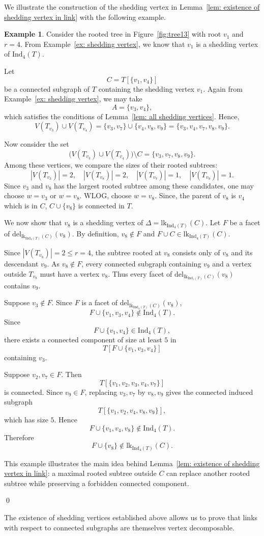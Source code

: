 \documentclass[12pt,reqno]{amsart}
\theoremstyle{definition}
\newtheorem{example}[theorem]{Example}
\def\Ind{\mathrm{Ind}}
\def\del{\mathrm{del}}
\def\lk{\mathrm{lk}}
\begin{document}
We illustrate the construction of the shedding vertex in Lemma~\ref{lem: existence of shedding vertex in link} with the following example.

\begin{example}
Consider the rooted tree in Figure~\ref{fig:tree13} with root $v_1$ and $r=4$. From Example~\ref{ex: shedding vertex}, we know that $v_1$ is a shedding vertex of $\Ind_4(T)$. 

Let 
\[
C = T[\{v_1,v_4\}]
\]
be a connected subgraph of $T$ containing the shedding vertex $v_1$. Again from Example~\ref{ex: shedding vertex}, we may take
\[
A=\{v_3,v_4\},
\]
which satisfies the conditions of Lemma~\ref{lem: all shedding vertices}. Hence,
\[
V(T_{v_3}) \cup V(T_{v_4}) = \{v_3,v_7\} \cup \{v_4,v_8,v_9\}
= \{v_3,v_4,v_7,v_8,v_9\}.
\]

Now consider the set
\[
\big(V(T_{v_3}) \cup V(T_{v_4})\big)\setminus C
= \{v_3,v_7,v_8,v_9\}.
\]
Among these vertices, we compare the sizes of their rooted subtrees:
\[
|V(T_{v_3})|=2,\quad |V(T_{v_8})|=2,\quad |V(T_{v_7})|=1,\quad |V(T_{v_9})|=1.
\]
Since $v_3$ and $v_8$ has the largest rooted subtree among these candidates, one may choose $w=v_3$ or $w=v_8$. WLOG, choose $w = v_8$. Since, the parent of $v_8$ is $v_4$ which is in $C$, $C\cup\{v_8\}$ is connected in $T$.

We now show that $v_8$ is a shedding vertex of $\Delta=\lk_{\Ind_4(T)}(C)$. Let $F$ be a facet of $\del_{\lk_{\Ind_4(T)}(C)}(v_8)$. By definition, $v_8 \notin F$ and $F \cup C \in \lk_{\Ind_4(T)}(C)$.

Since $|V(T_{v_8})|=2 \le r=4$, the subtree rooted at $v_8$ consists only of $v_8$ and its descendant $v_9$. As $v_8 \notin F$, every connected subgraph containing $v_9$ and a vertex outside $T_{v_8}$ must have a vertex $v_8$. Thus every facet of $\del_{\lk_{\Ind_r(T)}(C)}(v_8)$ contains $v_9$. 

Suppose $v_3 \notin F$. Since $F$ is a facet of $\del_{\lk_{\Ind_4(T)}(C)}(v_8)$,
\[
F \cup \{v_1,v_3,v_4\} \notin \Ind_4(T).
\]
Since
\[
F \cup \{v_1,v_4\} \in \Ind_4(T),
\]
there exists a connected component of size at least $5$ in
\[
T[F \cup \{v_1,v_3,v_4\}]
\]
containing $v_3$.

Suppose $v_2,v_7 \in F$. Then
\[
T[\{v_1,v_2,v_3,v_4,v_7\}]
\]
is connected. Since $v_9 \in F$, replacing $v_3,v_7$ by $v_8,v_9$ gives the connected induced subgraph
\[
T[\{v_1,v_2,v_4,v_8,v_9\}],
\]
which has size $5$. Hence
\[
F \cup \{v_1,v_4,v_8\} \notin \Ind_4(T).
\]
Therefore
\[
F \cup \{v_8\} \notin \lk_{\Ind_4(T)}(C).
\]

This example illustrates the main idea behind Lemma~\ref{lem: existence of shedding vertex in link}: a maximal rooted subtree outside $C$ can replace another rooted subtree while preserving a forbidden connected component.

\qed
\end{example} 
The existence of shedding vertices established above allows us to prove that links with respect to connected subgraphs are themselves vertex decomposable.
\end{document}
